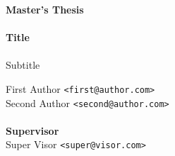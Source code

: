 \documentclass[a4paper,oneside]{memoir}
\begin{document}
    \thispagestyle{empty}
    \begin{adjustwidth}{-3cm}{-1.5cm}
    \vspace*{-1cm}
    \textbf{\Huge Master's Thesis} \\
    \vspace*{2.5cm} \\
    \textbf{\Huge Title} \\
    \vspace*{.1cm} \\
    {\huge Subtitle} \\
    \begin{tabbing}
    First Author \hspace{1cm} \= \texttt{<first@author.com>} \\
    Second Author \> \texttt{<second@author.com>} \\
    \\[12cm]
    \textbf{\Large Supervisor} \\
    Super Visor \> \texttt{<super@visor.com>} \\
    \end{tabbing}
    \end{adjustwidth}
    \newpage
    \ClearWallPaper
\end{document}
